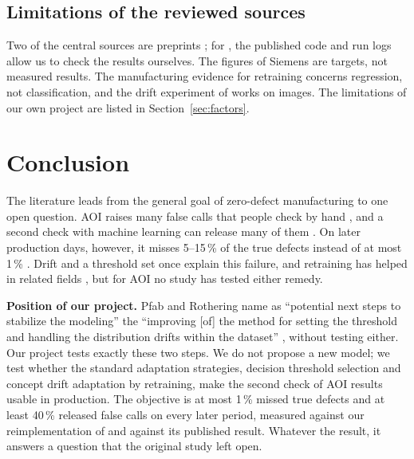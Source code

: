 \documentclass[11pt,a4paper]{article}
\begin{document}
\subsection{Limitations of the reviewed sources}
Two of the central sources are preprints \cite{pfab2025,gao2026}; for \cite{pfab2025}, the published code and run logs allow us to check the results ourselves. The figures of Siemens \cite{siemens2026} are targets, not measured results. The manufacturing evidence for retraining \cite{gao2026} concerns regression, not classification, and the drift experiment of \cite{bauer2025} works on images. The limitations of our own project are listed in Section~\ref{sec:factors}.

\section{Conclusion}
The literature leads from the general goal of zero-defect manufacturing \cite{psarommatis2020} to one open question. AOI raises many false calls that people check by hand \cite{ebayyeh2020,pfab2024}, and a second check with machine learning can release many of them \cite{thielen2020,albayari2026}. On later production days, however, it misses 5--15\,\% of the true defects instead of at most 1\,\% \cite{pfab2025}. Drift \cite{gama2014,bauer2025} and a threshold set once \cite{tong2018,saerens2002} explain this failure, and retraining has helped in related fields \cite{dalpozzolo2018,gao2026}, but for AOI no study has tested either remedy.

\textbf{Position of our project.} Pfab and Rothering name as ``potential next steps to stabilize the modeling'' the ``improving [of] the method for setting the threshold and handling the distribution drifts within the dataset'' \cite{pfab2025}, without testing either. Our project tests exactly these two steps. We do not propose a new model; we test whether the standard adaptation strategies, decision threshold selection and concept drift adaptation by retraining, make the second check of AOI results usable in production. The objective is at most 1\,\% missed true defects and at least 40\,\% released false calls on every later period, measured against our reimplementation of \cite{pfab2025} and against its published result. Whatever the result, it answers a question that the original study left open.
\end{document}
